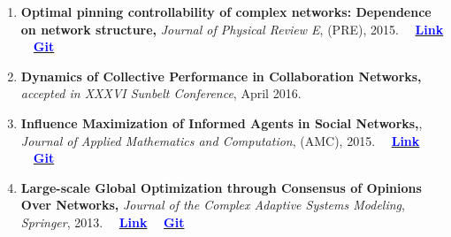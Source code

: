 \documentclass[letter]{res}
\begin{document}
\begin{resume}
\begin{enumerate}[leftmargin=-.01in]
                        \item \textbf{Optimal pinning controllability of complex networks: Dependence on network structure,} \textit{Journal of Physical Review E}, (PRE), 2015.
                        ~~\href{http://link.aps.org/doi/10.1103/PhysRevE.91.012803}{\textbf{\textcolor{blue}{Link}}}
                        ~~\href{https://github.com/omid55/optimal_pinning_control}{\textbf{\textcolor{blue}{Git}}}
			
                        \item \textbf{Dynamics of Collective Performance in Collaboration Networks,} \textit{accepted in XXXVI Sunbelt Conference}, April 2016.

			\item \textbf{Influence Maximization of Informed Agents in Social Networks,}, \textit{Journal of Applied Mathematics and Computation}, (AMC), 2015.
			~~\href{http://dx.doi.org/10.1016/j.amc.2014.12.139}{\textbf{\textcolor{blue}{Link}}}
			~~\href{https://github.com/omid55/influence_maximization}{\textbf{\textcolor{blue}{Git}}}
			
			\item \textbf{Large-scale Global Optimization through Consensus of Opinions Over Networks,} \textit{Journal of the Complex Adaptive Systems Modeling}, \textit{Springer}, 2013.
			~~\href{http://www.casmodeling.com/content/1/1/11}{\textbf{\textcolor{blue}{Link}}}
			~~\href{https://github.com/omid55/optimization_opinion_formation}{\textbf{\textcolor{blue}{Git}}}
			

\end{enumerate}
\end{resume}
\end{document}
